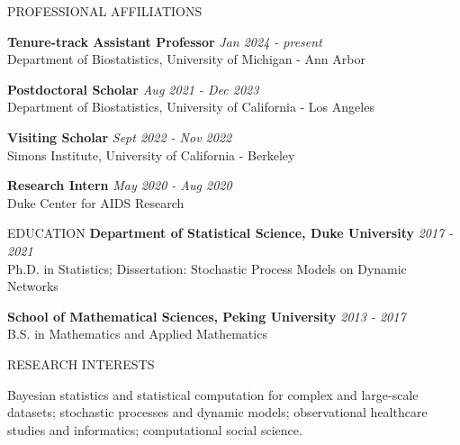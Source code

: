 \documentclass{resume} %
\begin{document}

\begin{rSection}{PROFESSIONAL AFFILIATIONS}
	
{\bf Tenure-track Assistant Professor} \hfill {\em Jan 2024  -  present} 
\\ {\small Department of Biostatistics, University of Michigan - Ann Arbor}
	
{\bf Postdoctoral Scholar} \hfill {\em Aug 2021 - Dec 2023} 
\\ {\small Department of Biostatistics, University of California - Los Angeles}

{\bf Visiting Scholar} \hfill {\em Sept 2022 - Nov 2022} 
\\ {\small Simons Institute, University of California - Berkeley}


{\bf Research Intern} \hfill {\em May 2020 - Aug 2020} 
\\ { \small Duke Center for AIDS Research}
\end{rSection}

\begin{rSection}{EDUCATION}
{\bf Department of Statistical Science, Duke University} \hfill {\em 2017 - 2021} 
\\ Ph.D. in Statistics; Dissertation: Stochastic Process Models on Dynamic Networks

{\bf School of Mathematical Sciences, Peking University} \hfill {\em 2013 - 2017} 
\\ B.S. in Mathematics and Applied Mathematics
\end{rSection}

\begin{rSection}{RESEARCH INTERESTS}

Bayesian statistics and statistical computation for complex and large-scale datasets; stochastic processes and dynamic models; observational healthcare studies and 
informatics; computational social science. %

\end{rSection}



\end{document}
